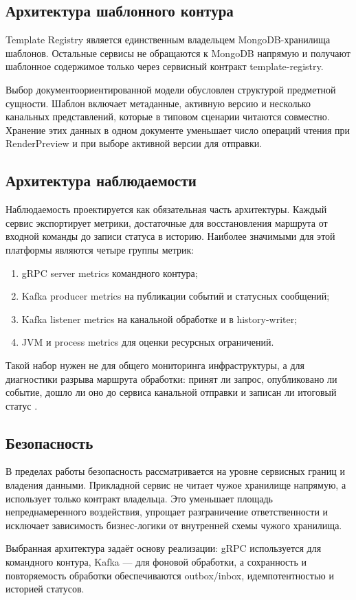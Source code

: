 \subsection{Архитектура шаблонного контура}

Template Registry является единственным владельцем MongoDB-хранилища шаблонов. Остальные сервисы не обращаются к MongoDB напрямую и получают шаблонное содержимое только через сервисный контракт template-registry.

Выбор документоориентированной модели обусловлен структурой предметной сущности. Шаблон включает метаданные, активную версию и несколько канальных представлений, которые в типовом сценарии читаются совместно. Хранение этих данных в одном документе уменьшает число операций чтения при RenderPreview и при выборе активной версии для отправки.

\subsection{Архитектура наблюдаемости}

Наблюдаемость проектируется как обязательная часть архитектуры. Каждый сервис экспортирует метрики, достаточные для восстановления маршрута от входной команды до записи статуса в историю. Наиболее значимыми для этой платформы являются четыре группы метрик:
\begin{enumerate}
    \item gRPC server metrics командного контура;
    \item Kafka producer metrics на публикации событий и статусных сообщений;
    \item Kafka listener metrics на канальной обработке и в history-writer;
    \item JVM и process metrics для оценки ресурсных ограничений.
\end{enumerate}

Такой набор нужен не для общего мониторинга инфраструктуры, а для диагностики разрыва маршрута обработки: принят ли запрос, опубликовано ли событие, дошло ли оно до сервиса канальной отправки и записан ли итоговый статус \cite{spring_boot_docs,kafka_docs}.

\subsection{Безопасность}

В пределах работы безопасность рассматривается на уровне сервисных границ и владения данными. Прикладной сервис не читает чужое хранилище напрямую, а использует только контракт владельца. Это уменьшает площадь непреднамеренного воздействия, упрощает разграничение ответственности и исключает зависимость бизнес-логики от внутренней схемы чужого хранилища.

Выбранная архитектура задаёт основу реализации: gRPC используется для командного контура, Kafka --- для фоновой обработки, а сохранность и повторяемость обработки обеспечиваются outbox/inbox, идемпотентностью и историей статусов.
